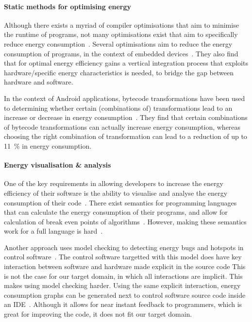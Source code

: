 \paragraph{Static methods for optimising energy}
Although there exists a myriad of compiler optimisations that aim to minimise the runtime of programs, not many optimisations exist that aim to specifically reduce energy consumption~\cite{pallister2016exploring}.
Several optimisations aim to reduce the energy consumption of programs, in the context of embedded devices~\cite{pallister2015optimizing,pallister2013identifying}.
They also find that for optimal energy efficiency gains a vertical integration process that exploits hardware\-/specific energy characteristics is needed, to bridge the gap between hardware and software.

In the context of Android applications, bytecode transformations have been used to determining whether certain (combinations of) transformations lead to an increase or decrease in energy consumption~\cite{bangash2022black}.
They find that certain combinations of bytecode transformations can actually increase energy consumption, whereas choosing the right combination of transformation can lead to a reduction of up to \qty{11}{\percent} in energy consumption.

\paragraph{Energy visualisation \& analysis}
One of the key requirements in allowing developers to increase the energy efficiency of their software is the ability to visualise and analyse the energy consumption of their code~\cite{steen2023organizational}.
There exist semantics for programming languages that can calculate the energy consumption of their programs, and allow for calculation of break even points of algorithms~\cite{gastel2016using,gastel2017towards,gastel2016assessing}.
However, making these semantics work for a full language is hard~\cite{gastel2017towards}.

Another approach uses model checking to detecting energy bugs and hotspots in control software~\cite{gastel2018detecting}.
The control software targetted with this model does have key interaction between software and hardware made explicit in the source code This is not the case for our target domain, in which all interactions are implicit.
This makes using model checking harder.
Using the same explicit interaction, energy consumption graphs can be generated next to control software source code inside an IDE~\cite{klinik2020skylines}.
Although it allows for near instant feedback to programmers, which is great for improving the code, it does not fit our target domain.


